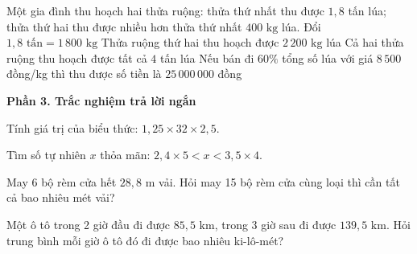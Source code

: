 \begin{ex} %
Một gia đình thu hoạch hai thửa ruộng: thửa thứ nhất thu được $1{,}8$ tấn lúa; thửa thứ hai thu được nhiều hơn thửa thứ nhất $400\text{ kg}$ lúa.
\choiceTF
{\True Đổi $1{,}8\text{ tấn} = 1\,800\text{ kg}$}
{\True Thửa ruộng thứ hai thu hoạch được $2\,200\text{ kg}$ lúa}
{\True Cả hai thửa ruộng thu hoạch được tất cả $4$ tấn lúa}
{Nếu bán đi $60\%$ tổng số lúa với giá $8\,500$ đồng/kg thì thu được số tiền là $25\,000\,000$ đồng}
\end{ex}

\textbf{Phần 3. Trắc nghiệm trả lời ngắn}

\begin{ex} %
Tính giá trị của biểu thức: $1{,}25 \times 32 \times 2{,}5$.
\end{ex}

\begin{ex} %
Tìm số tự nhiên $x$ thỏa mãn: $2{,}4 \times 5 < x < 3{,}5 \times 4$.
\end{ex}

\begin{ex} %
May 6 bộ rèm cửa hết $28{,}8\text{ m}$ vải. Hỏi may 15 bộ rèm cửa cùng loại thì cần tất cả bao nhiêu mét vải?
\end{ex}

\begin{ex} %
Một ô tô trong 2 giờ đầu đi được $85{,}5\text{ km}$, trong 3 giờ sau đi được $139{,}5\text{ km}$. Hỏi trung bình mỗi giờ ô tô đó đi được bao nhiêu ki-lô-mét?
\end{ex}

